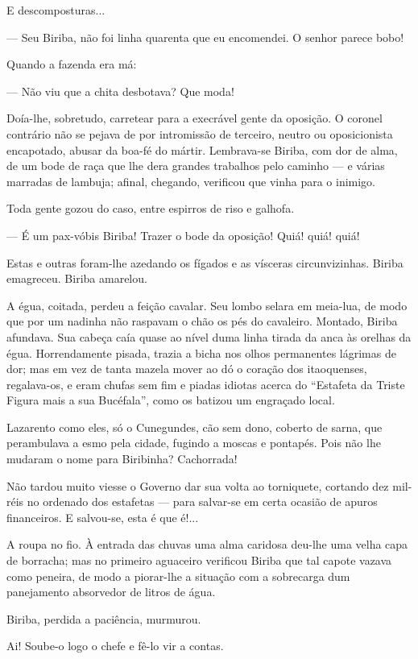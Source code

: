 E descomposturas...

--- Seu Biriba, não foi linha quarenta que eu encomendei. O senhor
parece bobo!

Quando a fazenda era má:

--- Não viu que a chita desbotava? Que moda!

Doía-lhe, sobretudo, carretear para a execrável gente da oposição. O
coronel contrário não se pejava de por intromissão de terceiro, neutro
ou oposicionista encapotado, abusar da boa-fé do mártir. Lembrava-se
Biriba, com dor de alma, de um bode de raça que lhe dera grandes
trabalhos pelo caminho --- e várias marradas de lambuja; afinal,
chegando, verificou que vinha para o inimigo.

Toda gente gozou do caso, entre espirros de riso e galhofa.

--- É um pax-vóbis Biriba! Trazer o bode da oposição! Quiá! quiá! quiá!

Estas e outras foram-lhe azedando os fígados e as vísceras
circunvizinhas. Biriba emagreceu. Biriba amarelou.

A égua, coitada, perdeu a feição cavalar. Seu lombo selara em meia-lua,
de modo que por um nadinha não raspavam o chão os pés do cavaleiro.
Montado, Biriba afundava. Sua cabeça caía quase ao nível duma linha
tirada da anca às orelhas da égua. Horrendamente pisada, trazia a bicha
nos olhos permanentes lágrimas de dor; mas em vez de tanta mazela mover
ao dó o coração dos itaoquenses, regalava-os, e eram chufas sem fim e
piadas idiotas acerca do ``Estafeta da Triste Figura mais a sua
Bucéfala'', como os batizou um engraçado local.

Lazarento como eles, só o Cunegundes, cão sem dono, coberto de sarna,
que perambulava a esmo pela cidade, fugindo a moscas e pontapés. Pois
não lhe mudaram o nome para Biribinha? Cachorrada!

Não tardou muito viesse o Governo dar sua volta ao torniquete, cortando
dez mil-réis no ordenado dos estafetas --- para salvar-se em certa
ocasião de apuros financeiros. E salvou-se, esta é que é!...

A roupa no fio. À entrada das chuvas uma alma caridosa deu-lhe uma velha
capa de borracha; mas no primeiro aguaceiro verificou Biriba que tal
capote vazava como peneira, de modo a piorar-lhe a situação com a
sobrecarga dum panejamento absorvedor de litros de água.

Biriba, perdida a paciência, murmurou.

Ai! Soube-o logo o chefe e fê-lo vir a contas.

